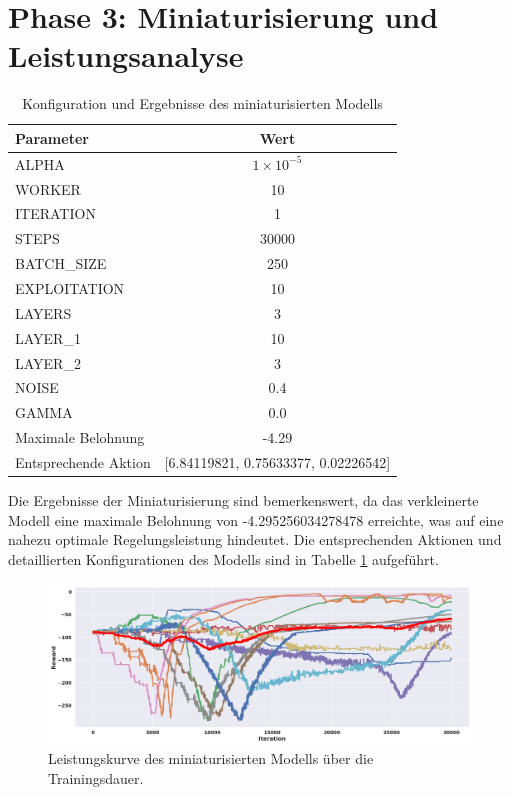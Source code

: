 \section{Phase 3: Miniaturisierung und Leistungsanalyse}
\label{subsec:Network_Miniaturization_Performance_Analysis}


\begin{table}[htbp]
\centering
\caption{Konfiguration und Ergebnisse des miniaturisierten Modells}
\label{tab:miniaturization_results}
\begin{tabular}{lc}
\hline
\textbf{Parameter} & \textbf{Wert} \\
\hline
ALPHA & \( 1 \times 10^{-5} \) \\
WORKER & 10 \\
ITERATION & 1 \\
STEPS & 30000 \\
BATCH\_SIZE & 250 \\
EXPLOITATION & 10 \\
LAYERS & 3 \\
LAYER\_1 & 10 \\
LAYER\_2 & 3 \\
NOISE & 0.4 \\
GAMMA & 0.0 \\
\hline
Maximale Belohnung & -4.29 \\
Entsprechende Aktion & [6.84119821, 0.75633377, 0.02226542] \\
\hline
\end{tabular}
\end{table}

Die Ergebnisse der Miniaturisierung sind bemerkenswert, da das verkleinerte Modell eine maximale Belohnung von -4.295256034278478 erreichte, was auf eine nahezu optimale Regelungsleistung hindeutet. Die entsprechenden Aktionen und detaillierten Konfigurationen des Modells sind in Tabelle \ref{tab:miniaturization_results} aufgeführt.

\begin{figure}[htbp]
\centering
\includegraphics[width=\textwidth]{4Ergebnisse/Phasen/3Phase/3R_big_training_minimize_epoch.png}
\caption{Leistungskurve des miniaturisierten Modells über die Trainingsdauer.}
\label{fig:miniaturized_model_performance}
\end{figure}

